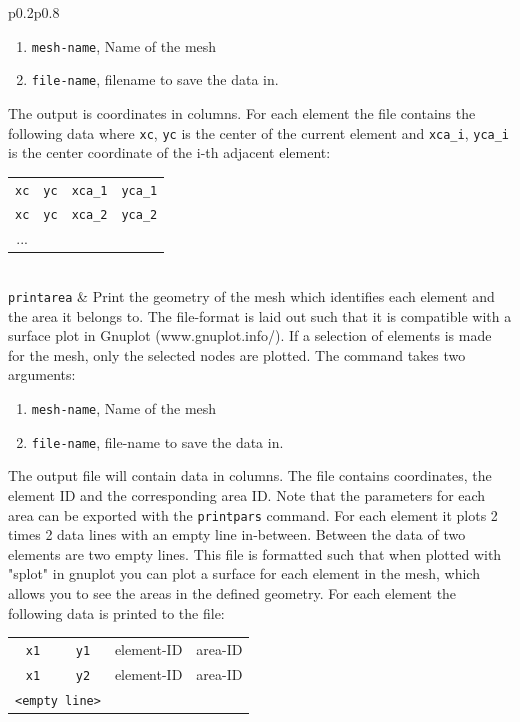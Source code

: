 \documentclass[noshowpacs,preprintnumbers,amsmath,amssymb, letter]{revtex4}
\begin{document}
\begin{longtable}{p{}p{}}
\begin{enumerate}
\item \texttt{mesh-name}, Name of the mesh
\item \texttt{file-name}, filename to save the data in.
\end{enumerate}
The output is coordinates in columns. For each element the file contains the following data where \texttt{xc}, \texttt{yc} is the center of the current element and \texttt{xca\_i}, \texttt{yca\_i} is the center coordinate of the i-th adjacent element: 
\begin{tabular}{cccc}
	\texttt{xc} & \texttt{yc} & \texttt{xca\_1} & \texttt{yca\_1} \\
	\texttt{xc} & \texttt{yc} & \texttt{xca\_2} & \texttt{yca\_2} \\
	... \\
\end{tabular}\\
\texttt{printarea}	& Print the geometry of the mesh which identifies each element and the area it belongs to. The file-format is laid out such that it is compatible with a surface plot in Gnuplot (www.gnuplot.info/).  If a selection of elements is made for the mesh, only the selected nodes are plotted. The command takes two arguments:
\begin{enumerate}
\item \texttt{mesh-name}, Name of the mesh
\item \texttt{file-name}, file-name to save the data in.
\end{enumerate}
The output file will contain data in columns. The file contains coordinates, the element ID and the corresponding area ID. Note that the parameters for each area can be exported with  the \texttt{printpars} command. For each element it plots 2 times 2 data lines with an empty line in-between. Between the data of two elements are two empty lines. This file is formatted such that when plotted with "splot" in gnuplot you can plot a surface for each element in the mesh, which allows you to see the areas in the defined geometry. For each element the following data is printed to the file:\newline 
\begin{tabular}{cccc}
	\texttt{x1} & \texttt{y1} & element-ID & area-ID\\
	\texttt{x1} & \texttt{y2} & element-ID & area-ID \\
	\multicolumn{2}{l}{\texttt{<empty line>}}\\

\end{tabular}
\end{longtable}
\end{document}
